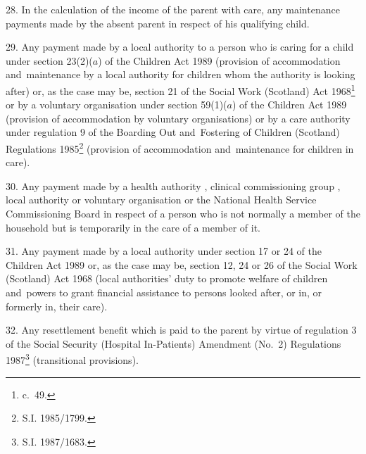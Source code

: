 \documentclass[12pt,a4paper]{article}
\begin{document}
\medskip

28.  In the calculation of the income of the parent with care, any maintenance payments made by the absent parent in respect of his qualifying child.

\medskip

29.  Any payment made by a local authority to a person who is caring for a child under section 23(2)($a$) of the Children Act 1989 (provision of accommodation and~maintenance by a local authority for children whom the authority is looking after) or, as the case may be, section 21 of the Social Work (Scotland) Act 1968\footnote{ c.~49.} or by a voluntary organisation under section 59(1)($a$) of the Children Act 1989 (provision of accommodation by voluntary organisations) or by a care authority under regulation 9 of the Boarding Out and~Fostering of Children (Scotland) Regulations 1985\footnote{\frenchspacing S.I. 1985/1799.} (provision of accommodation and~maintenance for children in care).

\medskip

30.  Any payment made by a health authority%
, 
clinical commissioning group%
, local authority or voluntary organisation 
or the National Health Service Commissioning Board  %
in respect of a person who is not normally a member of the household but is temporarily in the care of a member of it.


\medskip

31.  Any payment made by a local authority under section 17 or 24 of the Children Act 1989 or, as the case may be, section 12, 24 or 26 of the Social Work (Scotland) Act 1968 (local authorities' duty to promote welfare of children and~powers to grant financial assistance to persons looked after, or in, or formerly in, their care).

\medskip

32.  Any resettlement benefit which is paid to the parent by virtue of regulation 3 of the Social Security (Hospital In-Patients) Amendment (No.\ 2) Regulations 1987\footnote{\frenchspacing S.I. 1987/1683.} (transitional provisions).
\end{document}
